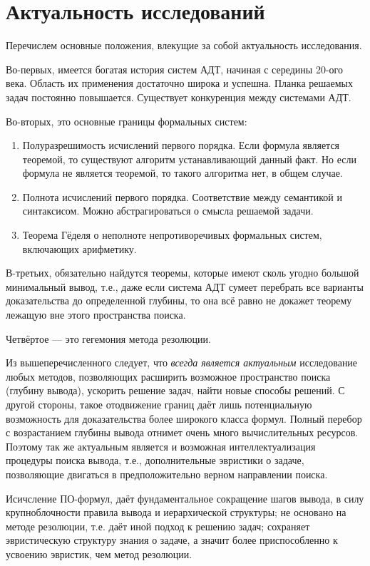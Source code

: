 \section{Актуальность исследований}
Перечислем основные положения, влекущие за собой актуальность исследования.

Во-первых, имеется богатая история систем АДТ, начиная с середины 20-ого века. Область их применения достаточно широка и успешна. Планка решаемых задач постоянно повышается. Существует конкуренция между системами АДТ.

Во-вторых, это основные границы формальных систем:
\begin{enumerate}
\item Полуразрешимость исчислений первого порядка. Если формула является теоремой, то существуют алгоритм устанавливающий данный факт. Но если формула не является теоремой, то такого алгоритма нет, в общем случае.
\item Полнота исчислений первого порядка. Соответствие между семантикой и синтаксисом. Можно абстрагироваться о смысла решаемой задачи.
\item Теорема Гёделя о неполноте непротиворечивых формальных систем, включающих арифметику.
\end{enumerate}

В-третьих, обязательно найдутся теоремы, которые имеют сколь угодно большой минимальный вывод, т.е., даже если система АДТ сумеет перебрать все варианты доказательства до определенной глубины, то она всё равно не докажет теорему лежащую вне этого пространства поиска. 

Четвёртое --- это гегемония метода резолюции.

Из вышеперечисленного следует, что \emph{всегда является актуальным} исследование любых методов, позволяющих расширить возможное пространство поиска (глубину вывода), ускорить решение задач, найти новые способы решений. С другой стороны, такое отодвижение границ даёт лишь потенциальную возможность для доказательства более широкого класса формул. Полный перебор с возрастанием глубины вывода отнимет очень много вычислительных ресурсов. Поэтому так же актуальным является и возможная интеллектуализация процедуры поиска вывода, т.е., дополнительные эвристики о задаче, позволяющие двигаться в предположительно верном направлении поиска.

Исичсление ПО-формул, даёт фундаментальное сокращение шагов вывода, в силу крупноблочности правила вывода и иерархической структуры; не основано на методе резолюции, т.е. даёт иной подход к решению задач; сохраняет эвристическую структуру знания о задаче, а значит более приспособленно к усвоению эвристик, чем метод резолюции.

